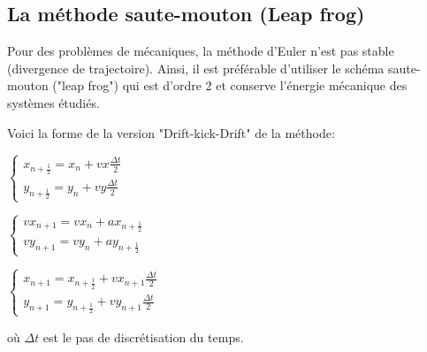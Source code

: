 \subsection{La méthode saute-mouton (Leap frog)}
Pour des problèmes de mécaniques, la méthode d'Euler n'est pas stable (divergence de trajectoire). Ainsi, il est préférable d'utiliser le schéma saute-mouton ("leap frog") qui est d'ordre 2 et conserve l'énergie mécanique des systèmes étudiés.

\vspace{3mm}
Voici la forme de la version "Drift-kick-Drift" de la méthode:
\vspace{2mm}

$
\left\{
    \begin{array}{ll}
        x_{n+\frac{1}{2}} = x_n + vx \frac{\Delta t}{2} \\
        y_{n+\frac{1}{2}} = y_n + vy \frac{\Delta t}{2}
    \end{array}
\right.
$

\vspace{3mm}

$
\left\{
    \begin{array}{ll}
        vx_{n+1} = vx_n + ax_{n+\frac{1}{2}} \\
        vy_{n+1} = vy_n + ay_{n+\frac{1}{2}}
    \end{array}
\right.
$

\vspace{3mm}

$
\left\{
    \begin{array}{ll}
        x_{n+1} = x_{n+\frac{1}{2}} + vx_{n+1}\frac{\Delta t}{2}\\
        y_{n+1} = y_{n+\frac{1}{2}} + vy_{n+1}\frac{\Delta t}{2}
    \end{array}
\right.
$

\vspace{2mm}

où $\Delta t$ est le pas de discrétisation du temps.
